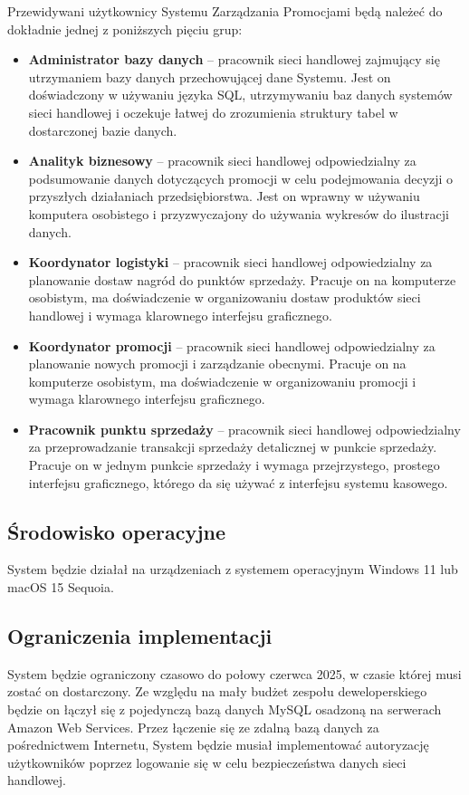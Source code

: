 \documentclass[a4paper,12pt]{article}
\begin{document}
Przewidywani użytkownicy Systemu Zarządzania Promocjami będą należeć do dokładnie jednej z poniższych pięciu grup:
\begin{itemize}
    \item \textbf{Administrator bazy danych} -- pracownik sieci handlowej zajmujący się utrzymaniem bazy danych przechowującej dane Systemu.
    Jest on doświadczony w używaniu języka SQL, utrzymywaniu baz danych systemów sieci handlowej i oczekuje łatwej do zrozumienia struktury tabel w dostarczonej bazie danych.
    \item \textbf{Analityk biznesowy} -- pracownik sieci handlowej odpowiedzialny za podsumowanie danych dotyczących promocji w celu podejmowania decyzji o przyszłych działaniach przedsiębiorstwa.
    Jest on wprawny w używaniu komputera osobistego i przyzwyczajony do używania wykresów do ilustracji danych.
    \item \textbf{Koordynator logistyki} -- pracownik sieci handlowej odpowiedzialny za planowanie dostaw nagród do punktów sprzedaży.
    Pracuje on na komputerze osobistym, ma doświadczenie w organizowaniu dostaw produktów sieci handlowej i wymaga klarownego interfejsu graficznego.
    \item \textbf{Koordynator promocji} -- pracownik sieci handlowej odpowiedzialny za planowanie nowych promocji i zarządzanie obecnymi.
    Pracuje on na komputerze osobistym, ma doświadczenie w organizowaniu promocji i wymaga klarownego interfejsu graficznego.
    \item \textbf{Pracownik punktu sprzedaży} -- pracownik sieci handlowej odpowiedzialny za przeprowadzanie transakcji sprzedaży detalicznej w punkcie sprzedaży.
    Pracuje on w jednym punkcie sprzedaży i wymaga przejrzystego, prostego interfejsu graficznego, którego da się używać z interfejsu systemu kasowego.
\end{itemize}

\subsection{Środowisko operacyjne}

System będzie działał na urządzeniach z systemem operacyjnym Windows 11 lub macOS 15 Sequoia.

\subsection{Ograniczenia implementacji}

System będzie ograniczony czasowo do połowy czerwca 2025, w czasie której musi zostać on dostarczony.
Ze względu na mały budżet zespołu deweloperskiego będzie on łączył się z pojedynczą bazą danych MySQL osadzoną na serwerach Amazon Web Services.
Przez łączenie się ze zdalną bazą danych za pośrednictwem Internetu, System będzie musiał implementować autoryzację użytkowników poprzez logowanie się w celu bezpieczeństwa danych sieci handlowej.
\end{document}
